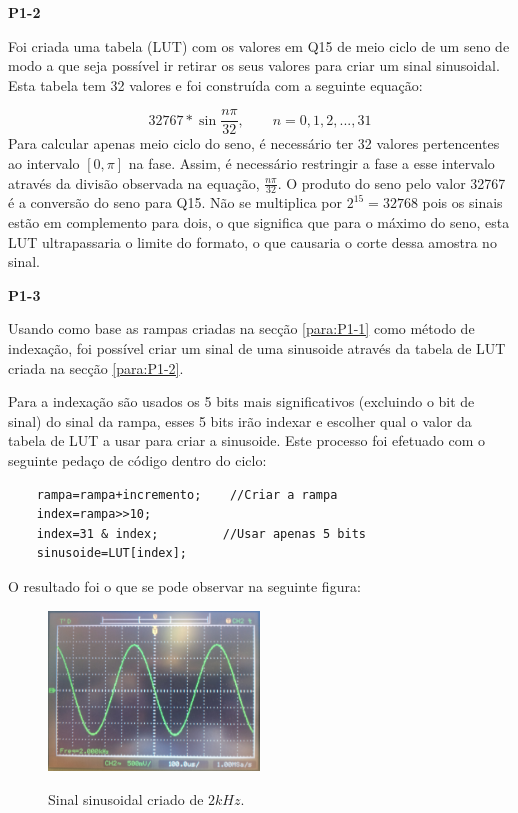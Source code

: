 \documentclass[11pt]{article}
\begin{document}
\textbf{P1-2}
\label{para:P1-2}

Foi criada uma tabela (LUT) com os valores em Q15 de meio ciclo de um seno de modo a que seja possível ir retirar os seus valores para criar um sinal sinusoidal. Esta tabela tem 32 valores e foi construída com a seguinte equação:

\begin{equation}
32767*\sin \dfrac{n \pi}{32},  \quad \quad n=0,1,2,...,31
\end{equation}
Para calcular apenas meio ciclo do seno, é necessário ter 32 valores pertencentes ao intervalo $[0,\pi]$ na fase. Assim, é necessário restringir a fase a esse intervalo através da divisão observada na equação, $\frac{n \pi}{32}$. O produto do seno pelo valor 32767 é a conversão do seno para Q15. Não se multiplica por $2 ^{15}=32768$ pois os sinais estão em complemento para dois, o que significa que para o máximo do seno, esta LUT ultrapassaria o limite do formato, o que causaria o corte dessa amostra no sinal.
\vspace{2 mm}

\textbf{P1-3}
\label{para:P1-3}

Usando como base as rampas criadas na secção \ref{para:P1-1} como método de indexação, foi possível criar um sinal de uma sinusoide através da tabela de LUT criada na secção \ref{para:P1-2}.

Para a indexação são usados os 5 bits mais significativos (excluindo o bit de sinal) do sinal da rampa, esses 5 bits irão indexar e escolher qual o valor da tabela de LUT a usar para criar a sinusoide. Este processo foi efetuado com o seguinte pedaço de código dentro do ciclo:

\begin{lstlisting}
	rampa=rampa+incremento;    //Criar a rampa
	index=rampa>>10;
	index=31 & index;         //Usar apenas 5 bits
	sinusoide=LUT[index];
\end{lstlisting}

O resultado foi o que se pode observar na seguinte figura:

\begin{figure}[H]
	\centering
	\includegraphics[width=0.5\textwidth]{./P1_1seno}~\\
	\caption{Sinal sinusoidal criado de $ 2 kHz $.}
\end{figure}
\end{document}
